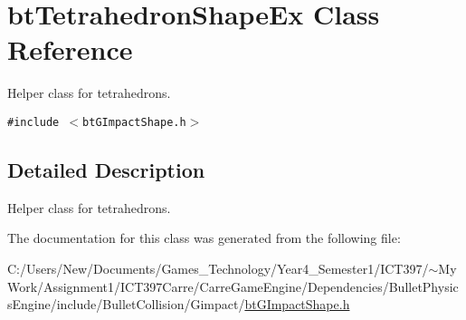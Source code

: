 \hypertarget{classbt_tetrahedron_shape_ex}{
\section{btTetrahedronShapeEx Class Reference}
\label{classbt_tetrahedron_shape_ex}
}
Helper class for tetrahedrons.  


{\tt \#include $<$btGImpactShape.h$>$}



\subsection{Detailed Description}
Helper class for tetrahedrons. 

The documentation for this class was generated from the following file:\begin{CompactItemize}
\item 
C:/Users/New/Documents/Games\_\-Technology/Year4\_\-Semester1/ICT397/$\sim$My Work/Assignment1/ICT397Carre/CarreGameEngine/Dependencies/BulletPhysicsEngine/include/BulletCollision/Gimpact/\hyperlink{bt_g_impact_shape_8h}{btGImpactShape.h}\end{CompactItemize}
